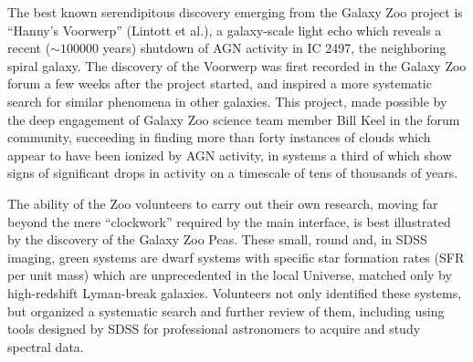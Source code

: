 \documentclass{ar2e}
\begin{document}
% 


 The best known serendipitous discovery
emerging from the Galaxy Zoo project is ``Hanny's Voorwerp'' (Lintott et al.), a
galaxy-scale light echo which reveals a recent ($\sim 100000$ years) shutdown of
AGN activity in IC 2497, the neighboring spiral galaxy. The discovery of the
Voorwerp was first recorded in the Galaxy Zoo forum a few weeks after the
project started, and inspired a more systematic search for similar phenomena in
other galaxies. This project, made possible by the deep engagement of Galaxy Zoo
science team member Bill Keel in the forum community, succeeding in finding more
than forty instances of clouds which appear to have been ionized by AGN
activity, in systems a third of which show signs of significant drops in
activity on a timescale of tens of thousands of years. 

The ability of the Zoo volunteers to carry out their own research, moving far
beyond the mere ``clockwork'' required by the main interface, is best
illustrated by the discovery of the Galaxy Zoo Peas. These small, round and, in
SDSS imaging, green systems are dwarf systems with specific star formation rates
(SFR per unit mass) which are unprecedented in the local Universe, matched only
by high-redshift Lyman-break galaxies. Volunteers not only identified these
systems, but organized a systematic search and further review of them, including
using tools designed by SDSS for professional astronomers to acquire and study
spectral data. 
\end{document}
